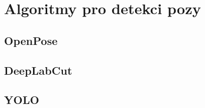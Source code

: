 \chapter{Algoritmy pro detekci pozy}
\label{sec:Pose}
\section{OpenPose}
\section{DeepLabCut}
\section{YOLO}
\endinput